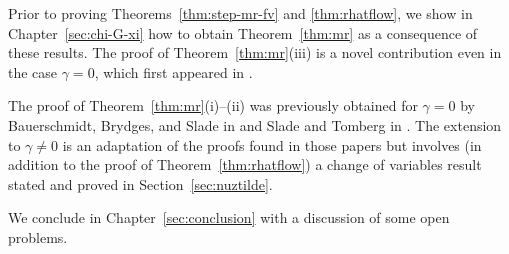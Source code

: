 Prior to proving Theorems~\ref{thm:step-mr-fv} and \ref{thm:rhatflow}, we show in
Chapter~\ref{sec:chi-G-xi} how to obtain Theorem~\ref{thm:mr} as a consequence of
these results. The proof of
Theorem~\ref{thm:mr}(iii) is a novel contribution even in the case $\gamma = 0$,
which first appeared in \cite{BSTW-clp}.

The proof of Theorem~\ref{thm:mr}(i)--(ii) was previously obtained for $\gamma = 0$
by Bauerschmidt, Brydges, and Slade in \cite{BBS-saw4-log,BBS-phi4-log,BBS-saw4}
and Slade and Tomberg in \cite{ST-phi4}. The extension to $\gamma \ne 0$ is an adaptation
of the proofs found in those papers but involves
(in addition to the proof of Theorem~\ref{thm:rhatflow}) a change of variables result
stated and proved in Section~\ref{sec:nuztilde}.

We conclude in Chapter~\ref{sec:conclusion} with a discussion of some open problems.



  
